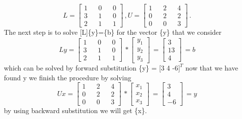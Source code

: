 \documentclass{beamer}
\begin{document}
\begin{frame}%
\begin{equation*}
L = \left[ \begin{aligned}
1 && 0 && 0 \\
3 && 1 && 0 \\
2 && 1 && 1
\end{aligned}
\right]\,,
U = \left[ \begin{aligned}
1 && 2 && 4 \\
0 && 2 && 2 \\
0 && 0 && 3
\end{aligned}
\right]\,.
\end{equation*}
The next step is to solve [L]\{y\}=\{b\} for the vector \{y\} that we consider
\begin{equation*}
Ly = \left[ \begin{aligned}
1 && 0 && 0 \\
3 && 1 && 0 \\
2 && 1 && 1
\end{aligned}
\right]\,*
\left[ \begin{aligned}
y_1 \\
y_2 \\
y_3
\end{aligned}
\right]\,=
\left[ \begin{aligned}
3 \\
13 \\
4
\end{aligned}
\right]\,=
b
\end{equation*}
which can be solved by forward substitution \{y\} = [3 4 -6$]^T$ now that we have found y we finish the procedure by solving
\begin{equation*}
Ux = \left[ \begin{aligned}
1 && 2 && 4 \\
0 && 2 && 2 \\
0 && 0 && 3
\end{aligned}
\right]\,*
\left[ \begin{aligned}
x_1 \\
x_2 \\
x_3
\end{aligned}
\right]\,=
\left[ \begin{aligned}
3 \\
4 \\
-6
\end{aligned}
\right]\,=
y
\end{equation*}
by using backward substitution we will get \{x\}.
\end{frame}
\end{document}
